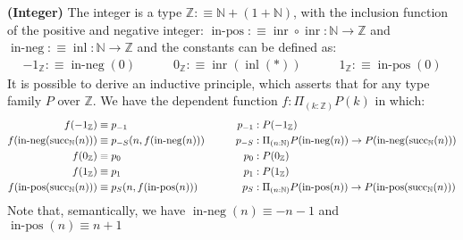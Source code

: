 \begin{definition}{\textbf{(Integer)}}
    The integer is a type $\mathbb{Z}:\equiv \mathbb{N}+(1+\mathbb{N})$, with the inclusion function of the positive and negative integer: $\operatorname{in-pos} :\equiv \operatorname{inr}\circ\operatorname{inr}:\mathbb{N}\rightarrow\mathbb{Z}$ and $\operatorname{in-neg} :\equiv \operatorname{inl}:\mathbb{N}\rightarrow\mathbb{Z}$ and the constants can be defined as:
    \begin{equation*}
    \begin{aligned}
        -1_\mathbb{Z} :\equiv \operatorname{in-neg}(0) \qquad\quad
        0_\mathbb{Z} :\equiv \operatorname{inr}(\operatorname{inl}(*)) \qquad\quad
        1_\mathbb{Z} :\equiv \operatorname{in-pos}(0)
    \end{aligned}
    \end{equation*}
    It is possible to derive an inductive principle, which asserts that for any type  family $P$ over $\mathbb{Z}$. We have the dependent function $f:\Pi_{(k:\mathbb{Z})}P(k)$ in which:
    \begin{equation*}
    \begin{aligned} 
        f(-1_\mathbb{Z}) &\equiv p_{-1} \\
        f(\operatorname{in-neg}(\operatorname{succ}_\mathbb{N}(n))) &\equiv p_{-S}(n, f(\operatorname{in-neg}(n))) \\ f(0_\mathbb{Z}) &\equiv p_{0} \\ 
        f(1_\mathbb{Z}) &\equiv p_{1} \\ 
        f(\operatorname{in-pos}(\operatorname{succ}_\mathbb{N}(n))) &\equiv p_{S}(n, f(\operatorname{in-pos}(n))) \\ 
    \end{aligned} \qquad \quad
    \begin{aligned} 
        p_{-1}&:P(-1_\mathbb{Z}) \\ 
        p_{-S}&: \Pi_{(n:\mathbb{N})}P(\operatorname{in-neg}(n))\rightarrow P(\operatorname{in-neg}(\operatorname{succ}_\mathbb{N}(n))) \\ 
        p_{0}&:P(0_\mathbb{Z}) \\ p_{1}&:P(1_\mathbb{Z}) \\ 
        p_{S}&: \Pi_{(n:\mathbb{N})}P(\operatorname{in-pos}(n))\rightarrow P(\operatorname{in-pos}(\operatorname{succ}_\mathbb{N}(n))) \\ 
    \end{aligned}
    \end{equation*}
    Note that, semantically, we have $\operatorname{in-neg}(n)\equiv -n-1$ and $\operatorname{in-pos}(n)\equiv n+1$
\end{definition}

